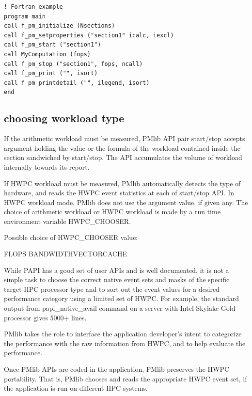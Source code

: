 \documentclass[conference]{IEEEtran}
\begin{document}
\begin{lstlisting}[caption={using PMlib in Fortran program},basicstyle=\footnotesize]
! Fortran example
program main
call f_pm_initialize (Nsections)
call f_pm_setproperties ("section1" icalc, iexcl)
call f_pm_start ("section1")
call MyComputation (fops)
call f_pm_stop ("section1", fops, ncall)
call f_pm_print ("", isort)
call f_pm_printdetail ("", ilegend, isort)
end
\end{lstlisting}


\subsection {choosing workload type}
If the arithmetic workload must be measured,
PMlib API pair start/stop accepts argument holding the value or the formula
of the workload contained inside the section sandwiched by start/stop.
The API accumulates the volume of workload internally towards its report.

If HWPC workload must be measured,
PMlib automatically detects the type of hardware, and reads the HWPC
event statistics at each of start/stop API.
In HWPC workload mode, PMlib does not use the argument value, if given any.
The choice of arithmetic workload or HWPC workload is made by a
run time environment variable HWPC\_CHOOSER.

Possible choice of HWPC\_CHOOSER value:

FLOPS \textbar BANDWIDTH\textbar VECTOR\textbar CACHE

While PAPI has a good set of user APIs and is well documented,
it is not a simple task to choose the correct native event sets and masks
of the specific target HPC processor type and to sort out the event values for
a desired performance category using a limited set of HWPC.
For example,
the standard output from papi\_native\_avail command on a server with
Intel Skylake Gold processor gives 5000+ lines.

PMlib takes the role to interface the application developer's intent to
categorize the performance with the raw information from HWPC, and to
help evaluate the performance.


Once PMlib APIs are coded in the application, PMlib preserves the HWPC
portability. That is, PMlib chooses and reads the appropriate HWPC event
set, if the application is run on different HPC systems.
\end{document}
